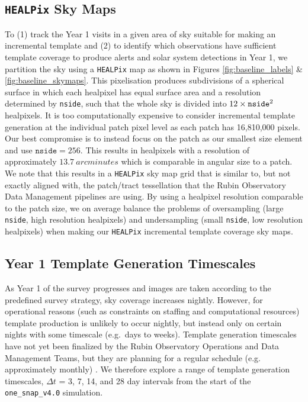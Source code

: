 \documentclass[preprintm,linenumbers]{aastex631}
\newcommand{\baseline}{\texttt{one\_snap\_v4.0}\xspace}
\newcommand{\nside}{\texttt{nside}\xspace}
\newcommand{\healpix}{\texttt{HEALPix}\xspace} %
\begin{document}
	\subsection{\healpix Sky Maps} 
	\label{sec:ITG}
	To (1) track the Year 1 visits in a given area of sky suitable for making an incremental template and (2) to identify which observations have sufficient template coverage to produce alerts and solar system detections in Year 1, we partition the sky using a \healpix map \citep[Hierarchical Equal Area isoLatitude Pixelization\footnote{\url{http://healpix.sourceforge.net}}; ][]{2005ApJ...622..759G} as shown in Figures \ref{fig:baseline_labels} \& \ref{fig:baseline_skymaps}.
    This pixelisation produces subdivisions of a spherical surface in which each healpixel has equal surface area and a resolution determined by \nside, such that the whole sky is divided into $12\times \verb|nside|^2$ healpixels. %
 It is too computationally expensive to consider incremental template generation at the individual patch pixel level as each patch has 16,810,000 pixels. 
 Our best compromise is to instead focus on the patch as our smallest size element and use $\texttt{nside}=256$. This results in healpixels with a resolution of approximately $13.7\ \si{arcminutes}$ which is comparable in angular size to a patch. %
	We note that this results in a \healpix sky map grid that is similar to, but not exactly aligned with, the patch/tract tessellation that the Rubin Observatory Data Management pipelines are using.  
 By using a healpixel resolution comparable to the patch size, we on average balance the problems of oversampling (large \nside, high resolution healpixels) and undersampling (small \nside, low resolution healpixels) when making our \healpix incremental template coverage sky maps.
	
	\subsection{Year 1 Template Generation Timescales}
	\label{sec:timescales}
	As Year 1 of the survey progresses and images are taken according to the predefined survey strategy, sky coverage increases nightly. 
 However, for operational reasons (such as constraints on staffing and computational resources)  template production is unlikely to occur nightly, but instead only on certain nights with some timescale (e.g.\ days to weeks). 
 Template generation timescales have not yet been finalized by the Rubin Observatory Operations and Data Management Teams, but they are planning for a regular schedule (e.g. approximately monthly) \citep{DMTN-107,RTN-011}. 
 We therefore explore a range of template generation timescales, $\Delta t$ =  3, 7, 14, and 28 day intervals from the start of the \baseline simulation. 
	
\end{document}
